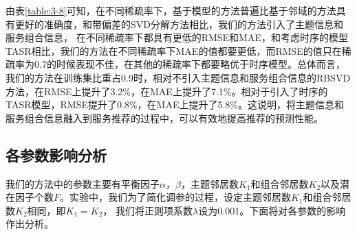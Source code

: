 \documentclass[master,winfonts]{njuthesis}
\begin{document}
由表\ref{table:3-8}可知，在不同稀疏率下，基于模型的方法普遍比基于邻域的方法具有更好的准确度，和带偏差的SVD分解方法相比，我们的方法引入了主题信息和服务组合信息， 在不同稀疏率下都具有更低的RMSE和MAE，和考虑时序的模型TASR相比，我们的方法在不同稀疏率下MAE的值都要更低，而RMSE的值只在稀疏率为0.7的时候表现不佳，在其他的稀疏率下都要略优于时序模型。总体而言，我们的方法在训练集比重占0.9时，相对不引入主题信息和服务组合信息的RBSVD方法，在RMSE上提升了3.2\%，在MAE上提升了7.1\%。相对于引入了时序的TASR模型，RMSE提升了0.8\%，在MAE上提升了5.8\%。这说明，将主题信息和服务组合信息融入到服务推荐的过程中，可以有效地提高推荐的预测性能。


\subsection{各参数影响分析}
我们的方法中的参数主要有平衡因子$\alpha$，$\beta$，主题邻居数$K_1$和组合邻居数$K_2$以及潜在因子个数$F$。实验中，我们为了简化调参的过程，设定主题邻居数$K_1$和组合邻居数$K_2$相同，即$K_1=K_2$，
我们将正则项系数$\lambda$设为0.001。下面将对各参数的影响作出分析。
\end{document}
